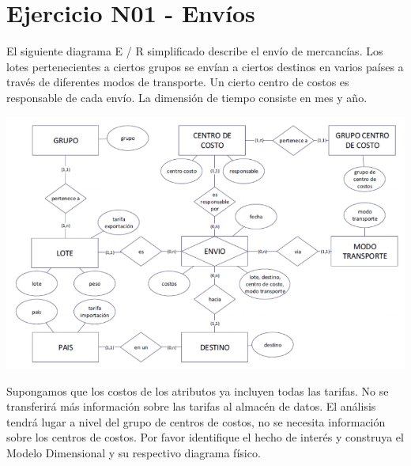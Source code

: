 \section{Ejercicio N01 - Envíos} 

El siguiente diagrama E / R simplificado describe el envío de mercancías. Los lotes pertenecientes a ciertos grupos se
envían a ciertos destinos en varios países a través de diferentes modos de transporte. Un cierto centro de costos es
responsable de cada envío. La dimensión de tiempo consiste en mes y año.

	\begin{center}
	\includegraphics[width=17cm]{./Imagenes/ejercicio1}
	\end{center}	

Supongamos que los costos de los atributos ya incluyen todas las tarifas. No se transferirá más información sobre las tarifas
al almacén de datos. El análisis tendrá lugar a nivel del grupo de centros de costos, no se necesita información sobre los
centros de costos.
Por favor identifique el hecho de interés y construya el Modelo Dimensional y su respectivo diagrama físico.
\\

